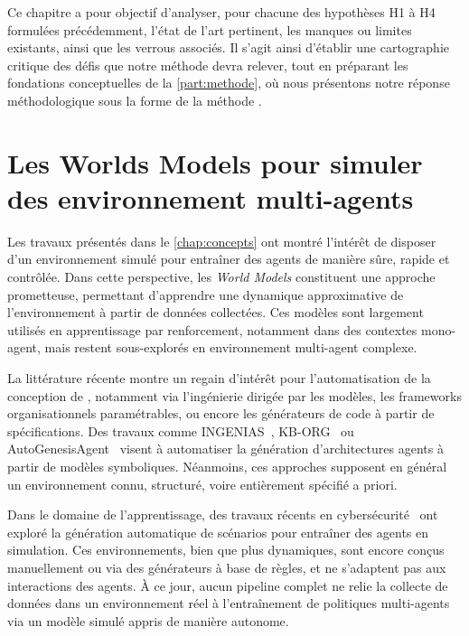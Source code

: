 Ce chapitre a pour objectif d'analyser, pour chacune des hypothèses H1 à H4 formulées précédemment, l'état de l'art pertinent, les manques ou limites existants, ainsi que les verrous associés. Il s'agit ainsi d'établir une cartographie critique des défis que notre méthode devra relever, tout en préparant les fondations conceptuelles de la \autoref{part:methode}, où nous présentons notre réponse méthodologique sous la forme de la méthode .


\section{Les Worlds Models pour simuler des environnement multi-agents}

\noindent
Les travaux présentés dans le \autoref{chap:concepts} ont montré l'intérêt de disposer d'un environnement simulé pour entraîner des agents de manière sûre, rapide et contrôlée. Dans cette perspective, les \textit{World Models} constituent une approche prometteuse, permettant d'apprendre une dynamique approximative de l'environnement à partir de données collectées. Ces modèles sont largement utilisés en apprentissage par renforcement, notamment dans des contextes mono-agent, mais restent sous-explorés en environnement multi-agent complexe.

\medskip

\noindent
La littérature récente montre un regain d'intérêt pour l'automatisation de la conception de , notamment via l'ingénierie dirigée par les modèles, les frameworks organisationnels paramétrables, ou encore les générateurs de code à partir de spécifications. Des travaux comme INGENIAS~\cite{Pavon2003}, KB-ORG~\cite{Sims2008} ou AutoGenesisAgent~\cite{harper2024autogenesisagent} visent à automatiser la génération d'architectures agents à partir de modèles symboliques. Néanmoins, ces approches supposent en général un environnement connu, structuré, voire entièrement spécifié a priori.

\noindent
Dans le domaine de l'apprentissage, des travaux récents en cybersécurité~\cite{hammar2023scalable} ont exploré la génération automatique de scénarios pour entraîner des agents en simulation. Ces environnements, bien que plus dynamiques, sont encore conçus manuellement ou via des générateurs à base de règles, et ne s'adaptent pas aux interactions des agents. À ce jour, aucun pipeline complet ne relie la collecte de données dans un environnement réel à l'entraînement de politiques multi-agents via un modèle simulé appris de manière autonome.

